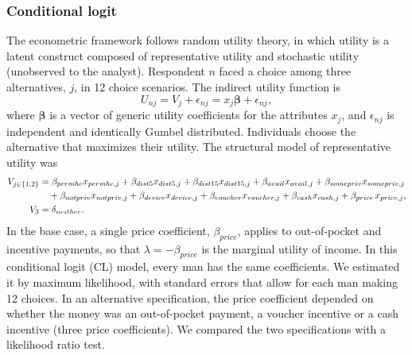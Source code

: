 \documentclass[11pt]{article}
\numberwithin{equation}{section}\numberwithin{figure}{section}\numberwithin{table}{section}
\begin{document}
\subsubsection{Conditional logit}
The econometric framework follows random utility theory,\cite{RN87} in which utility is a latent construct composed of representative utility and stochastic utility (unobserved to the analyst). Respondent $n$ faced a choice among three alternatives, $j$, in 12 choice scenarios. The indirect utility function is
\begin{equation}\label{eq:utility}
U_{nj} = V_{j} + \epsilon_{nj} = x_{j}\boldsymbol{\beta} + \epsilon_{nj},
\end{equation}
where $\boldsymbol{\beta}$ is a vector of generic utility coefficients for the attributes $x_j$, and $\epsilon_{nj}$ is independent and identically Gumbel distributed. Individuals choose the alternative that maximizes their utility. The structural model of representative utility was
\begin{align}
V_{j\in\{1,2\}} &= \beta_{permhc} x_{permhc,j} + \beta_{dist5} x_{dist5,j} + \beta_{dist15} x_{dist15,j} + \beta_{avail} x_{avail,j} + \beta_{somepriv} x_{somepriv,j} \notag\\
 &\quad + \beta_{notpriv} x_{notpriv,j} + \beta_{device} x_{device,j} + \beta_{voucher} x_{voucher,j} + \beta_{cash} x_{cash,j} + \beta_{price}\, x_{price,j}, \label{eq:structural}\\
V_{3} &= \delta_{neither}. \notag
\end{align}
In the base case, a single price coefficient, $\beta_{price}$, applies to out-of-pocket and incentive payments, so that $\lambda = -\beta_{price}$ is the marginal utility of income. In this conditional logit (CL) model, every man has the same coefficients. We estimated it by maximum likelihood, with standard errors that allow for each man making 12 choices. In an alternative specification, the price coefficient depended on whether the money was an out-of-pocket payment, a voucher incentive or a cash incentive (three price coefficients). We compared the two specifications with a likelihood ratio test.
\end{document}
